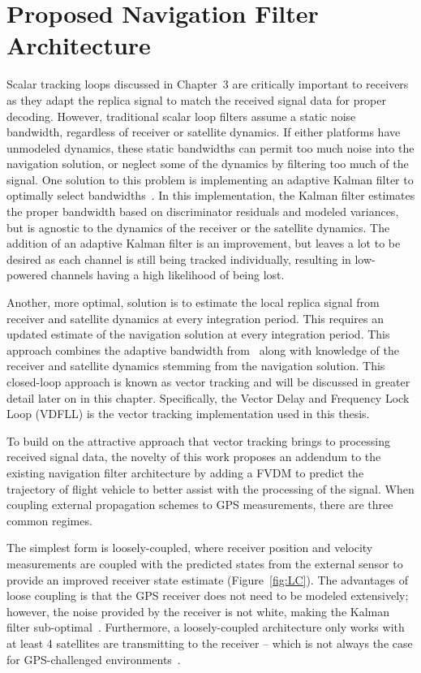 \chapter{\textbf{Proposed Navigation Filter Architecture}}
Scalar tracking loops discussed in Chapter~3 are critically important to receivers as they adapt the replica signal to match the received signal data for proper decoding. However, traditional scalar loop filters assume a static noise bandwidth, regardless of receiver or satellite dynamics. If either platforms have unmodeled dynamics, these static bandwidths can permit too much noise into the navigation solution, or neglect some of the dynamics by filtering too much of the signal. One solution to this problem is implementing an adaptive Kalman filter to optimally select bandwidths~\cite{huangIntegratedAdaptiveKalman2019}. In this implementation, the Kalman filter estimates the proper bandwidth based on discriminator residuals and modeled variances, but is agnostic to the dynamics of the receiver or the satellite dynamics. The addition of an adaptive Kalman filter is an improvement, but leaves a lot to be desired as each channel is still being tracked individually, resulting in low-powered channels having a high likelihood of being lost.

Another, more optimal, solution is to estimate the local replica signal from receiver and satellite dynamics at every integration period. This requires an updated estimate of the navigation solution at every integration period. This approach combines the adaptive bandwidth from~\cite{huangIntegratedAdaptiveKalman2019} along with knowledge of the receiver and satellite dynamics stemming from the navigation solution. This closed-loop approach is known as {vector tracking} and will be discussed in greater detail later on in this chapter. Specifically, the Vector Delay and Frequency Lock Loop (VDFLL) is the vector tracking implementation used in this thesis.

To build on the attractive approach that vector tracking brings to processing received signal data, the novelty of this work proposes an addendum to the existing navigation filter architecture by adding a FVDM to predict the trajectory of flight vehicle to better assist with the processing of the signal. When coupling external propagation schemes to GPS measurements, there are three common regimes.

The simplest form is loosely-coupled, where receiver position and velocity measurements are coupled with the predicted states from the external sensor to provide an improved receiver state estimate (Figure~\ref{fig:LC}). The advantages of loose coupling is that the GPS receiver does not need to be modeled extensively; however, the noise provided by the receiver is not white, making the Kalman filter sub-optimal~\cite{lashleyPerformanceAnalysisVector2009}. Furthermore, a {loosely-coupled} architecture only works with at least 4 satellites are transmitting to the receiver {--} which is not always the case for GPS-challenged environments~\cite{grovesPrinciplesGNSSInertial2012}.

